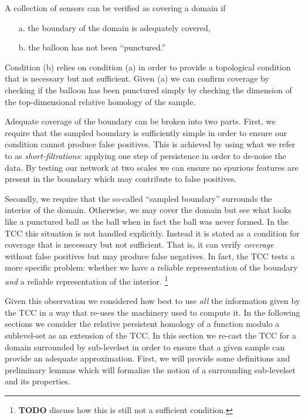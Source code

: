 
A collection of sensors can be verified as covering a domain if
\begin{enumerate}
    \item[a.] the boundary of the domain is adequately covered,
    \item[b.] the balloon has not been ``punctured.''
\end{enumerate}
Condition (b) relies on condition (a) in order to provide a topological condition that is necessary but not sufficient.
Given (a) we can confirm coverage by checking if the balloon has been punctured simply by checking the dimension of the top-dimensional relative homology of the sample.

Adequate coverage of the boundary can be broken into two parts.
First, we require that the sampled boundary is sufficiently simple in order to ensure our condition cannot produce false positives.
This is achieved by using what we refer to as \emph{short-filtrations}: applying one step of persistence in order to de-noise the data.
By testing our network at two scales we can ensure no spurious features are present in the boundary which may contribute to false positives.

Secondly, we require that the so-called ``sampled boundary'' surrounds the interior of the domain.
Otherwise, we may cover the domain but see what looks like a punctured ball as the ball when in fact the ball was never formed.
In the TCC this situation is not handled explicitly.
Instead it is stated as a condition for coverage that is necessary but not sufficient.
That is, it can verify \emph{coverage} without false positives but may produce false negatives.
In fact, the TCC tests a more specific problem: whether we have a reliable representation of the boundary \emph{and} a reliable representation of the interior.
\footnote{\textbf{TODO} discuss how this is still not a sufficient condition.}

Given this observation we considered how best to use \emph{all} the information given by the TCC in a way that re-uses the machinery used to compute it.
In the following sections we consider the relative persistent homology of a function modulo a sublevel-set as an extension of the TCC.
In this section we re-cast the TCC for a domain surrounded by sub-levelset in order to ensure that a given sample can provide an adequate approximation.
First, we will provide some definitions and preliminary lemmas which will formalize the notion of a surrounding sub-levelset and its properties.
